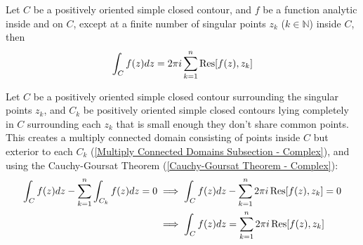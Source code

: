 \documentclass[12pt, english]{book}
\makeatletter
\renewenvironment{proof}[1][\proofname]{\par
	\pushQED{\qed}%
	\normalfont \topsep6\p@\@plus6\p@\relax
	\list{}{%
		\settowidth{\leftmargin}{\itshape\proofname:\hskip\labelsep}%
		\setlength{\labelwidth}{0pt}%
		\setlength{\itemindent}{-\leftmargin}%
		}%
	\item[\hskip\labelsep\itshape#1\@addpunct{:}]\ignorespaces
	}{\popQED\endlist\@endpefalse}
\makeatother
\begin{document}
	\begin{figure}[H]
		\centering
	\end{figure}
	
	\begin{theorem}
		\label{Cauchy's Residue Theorem - Complex}
		Let \(C\) be a positively oriented simple closed contour, and \(f\) be a function analytic inside and on \(C\), except at a finite number of singular points \(z_k\) (\(k \in \mathbb{N}\)) inside \(C\), then 
		\begin{align*}
			\int_{C} f(z) dz = 2\pi i \sum_{k=1}^{n} \Res[f(z), z_k] 
		\end{align*}
	\end{theorem}
	\begin{proof}
		Let \(C\) be a positively oriented simple closed contour surrounding the singular points \(z_k\), and \(C_k\) be positively oriented simple closed contours lying completely in \(C\) surrounding each \(z_k\) that is small enough they don't share common points. 
		This creates a multiply connected domain consisting of points inside \(C\) but exterior to each \(C_k\) (\cref{Multiply Connected Domains Subsection - Complex}), and using the Cauchy-Goursat Theorem (\cref{Cauchy-Goursat Theorem - Complex}):
		\begin{align*}
			\int_{C} f(z) dz - \sum_{k=1}^{n} \int_{C_k} f(z) dz = 0
			&\implies \int_{C} f(z) dz - \sum_{k=1}^{n} 2\pi i \Res[f(z), z_k]= 0 \\
			&\implies \int_{C} f(z) dz = \sum_{k=1}^{n} 2\pi i \Res[f(z), z_k]
		\end{align*}
	\end{proof}
\end{document}
